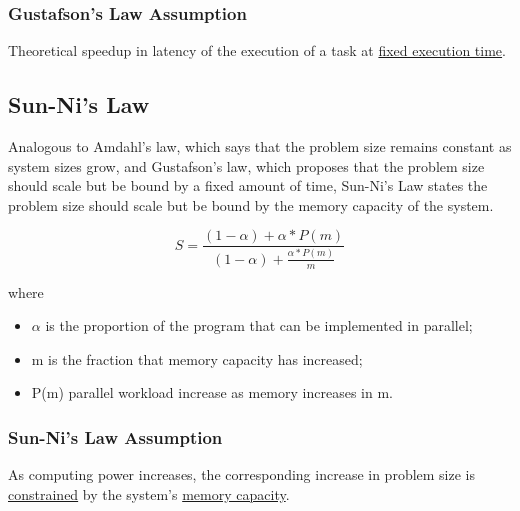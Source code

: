 \documentclass[12pt]{article}
\numberwithin{equation}{section}
\numberwithin{table}{section}
\numberwithin{figure}{section}
\begin{document}
\subsubsection*{Gustafson's Law Assumption}Theoretical speedup in latency of the execution of a task at \underline{fixed execution time}.\cite{GUSTAFSON}

\subsection*{Sun-Ni's Law}
Analogous to Amdahl's law, which says that the problem size remains constant as system sizes grow, and Gustafson's law, which proposes that the problem size should scale but be bound by a fixed amount of time, Sun-Ni's Law states the problem size should scale but be bound by the memory capacity of the system.\cite{NIL1}\cite{NIL2}

\begin{equation}
S = \frac{(1-\alpha) + \alpha*P(m)}{(1-\alpha) + \frac{\alpha*P(m)}{m}}
\end{equation}

where

\begin{itemize}
	\item $\alpha$ is the proportion of the program that can be implemented in parallel;
	
	\item m is the fraction that memory capacity has increased;
	
	\item P(m) parallel workload increase as memory increases in m.
\end{itemize}
\subsubsection*{Sun-Ni's Law Assumption}As computing power increases, the corresponding increase in problem size is \underline{constrained} by the system’s \underline{memory capacity}.
\end{document}
